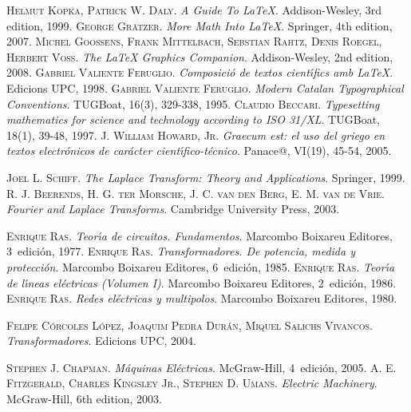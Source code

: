 \begin{thebibliography}{99}


     \textsc{Helmut Kopka, Patrick W. Daly}. \textsl{A Guide To \LaTeX}.  Addison-Wesley, 3rd edition, 1999.
     \textsc{George Gr\"{a}tzer}. \textsl{More Math Into \LaTeX}.  Springer, 4th edition, 2007.
     \textsc{Michel Goossens, Frank Mittelbach, Sebstian Rahtz, Denis Roegel, Herbert Vo{\ss}}. \textsl{The \LaTeX{} Graphics Companion}.  Addison-Wesley, 2nd edition, 2008.
     \textsc{Gabriel Valiente Feruglio}. \textsl{Composici\'{o} de textos cient\'{\i}fics amb \LaTeX}.  Edicions UPC, 1998.
     \textsc{Gabriel Valiente Feruglio}. \textsl{Modern Catalan Typographical Conventions}.  TUGBoat, 16(3), 329-338, 1995.
     \textsc{Claudio Beccari}. \textsl{Typesetting mathematics for science and technology according to ISO 31/XL}.  TUGBoat, 18(1), 39-48, 1997.
     \textsc{J. William Howard, Jr}. \textsl{Graecum est: el uso del griego en textos electr\'{o}nicos de car\'{a}cter cient\'{\i}fico-t\'{e}cnico}.  Panace@, VI(19), 45-54, 2005.


     \textsc{Joel L. Schiff}. \textsl{The Laplace Transform: Theory and Applications}.  Springer, 1999.
     \textsc{R. J. Beerends, H. G. ter Morsche, J. C. van den Berg, E. M. van de Vrie}. \textsl{Fourier and Laplace Transforms}.  Cambridge University Press, 2003.


     \textsc{Enrique Ras}. \textsl{Teor\'{\i}a de circuitos. Fundamentos}.  Marcombo Boixareu Editores, 3\textordfeminine\ edici\'{o}n, 1977.
     \textsc{Enrique Ras}. \textsl{Transformadores. De potencia, medida y protecci\'{o}n}.  Marcombo Boixareu Editores, 6\textordfeminine\ edici\'{o}n, 1985.
     \textsc{Enrique Ras}. \textsl{Teor\'{\i}a de l\'{\i}neas el\'{e}ctricas (Volumen I)}.  Marcombo Boixareu Editores, 2\textordfeminine\ edici\'{o}n, 1986.
     \textsc{Enrique Ras}. \textsl{Redes el\'{e}ctricas y multipolos}.  Marcombo Boixareu Editores, 1980.


     \textsc{Felipe C\'{o}rcoles L\'{o}pez, Joaquim Pedra Dur\'{a}n, Miquel Salichs Vivancos}. \textsl{Transformadores}.  Edicions UPC, 2004.


     \textsc{Stephen J. Chapman}. \textsl{M\'{a}quinas El\'{e}ctricas}.  McGraw-Hill, 4\textordfeminine\ edici\'{o}n, 2005.
     \textsc{A. E. Fitzgerald, Charles Kingsley Jr., Stephen D. Umans}. \textsl{Electric Machinery}.  McGraw-Hill, 6th edition, 2003.



\end{thebibliography}
